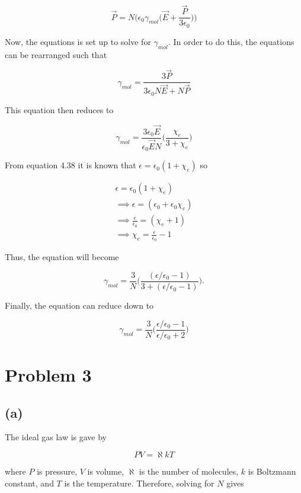 \documentclass[11pt]{article}
\begin{document}
$$
\vec{P} = N\bigg(\epsilon_{0}\gamma_{mol}\Bigg(\vec{E} + \frac{\vec{P}}{3\epsilon_{0}}\Bigg)\Bigg)
$$

Now, the equations is set up to solve for $\gamma_{mol}$. In order to do this, the equations can be rearranged such that 

$$
\gamma_{mol} = \frac{3\vec{P}}{3\epsilon_{0}N\vec{E} + N\vec{P}}
$$

This equation then reduces to 

$$
\gamma_{mol} = \frac{3\epsilon_{0}\vec{E}}{\epsilon_{0}\vec{E}N}\Bigg(\frac{\chi_{e}}{3 + \chi_{e}}\Bigg)
$$

From equation 4.38 it is known that $\epsilon = \epsilon_{0}(1 + \chi_{e})$ so

\begin{equation*}
\begin{aligned}
\epsilon = \epsilon_{0}(1 + \chi_{e}) \\
\implies \epsilon = (\epsilon_{0} + \epsilon_{0} \chi_{e}) \\ 
\implies \frac{\epsilon}{\epsilon_{0}} = (\chi_{e} + 1) \\
\implies \chi_{e} = \frac{\epsilon}{\epsilon_{0}} - 1
\end{aligned}
\end{equation*}

Thus, the equation will become

$$
\gamma_{mol} = \frac{3}{N}\Bigg(\frac{(\epsilon/\epsilon_{0} - 1)}{3 + (\epsilon/\epsilon_{0} - 1)}\Bigg).
$$

Finally, the equation can reduce down to 

$$
\gamma_{mol} = \frac{3}{N}\Bigg(\frac{\epsilon/\epsilon_{0} - 1}{\epsilon/\epsilon_{0} + 2}\Bigg)
$$

\clearpage

\section*{Problem 3}
\subsection*{(a)}

The ideal gas law is gave by

$$
PV = \aleph kT
$$

where $P$ is pressure, $V$ is volume, $\aleph$ is the number of molecules, $k$ is Boltzmann constant, and $T$ is the temperature. Therefore, solving for $N$ gives 
\end{document}
